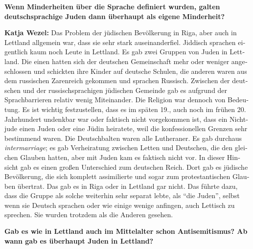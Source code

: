 \begin{otherlanguage}{ngerman}
\textbf{Wenn Minderheiten über die Sprache definiert wurden, galten deutschsprachige Juden dann überhaupt als eigene Minderheit?} 

\textbf{Katja Wezel:} Das Problem der jüdischen Bevölkerung in Riga, aber auch in Lettland allgemein war, dass sie sehr stark auseinanderfiel. Jiddisch sprachen eigentlich kaum noch Leute in Lettland. Es gab zwei Gruppen von Juden in Lettland. Die einen hatten sich der deutschen Gemeinschaft mehr oder weniger angeschlossen und schickten ihre Kinder auf deutsche Schulen, die anderen waren aus dem russischen Zarenreich gekommen und sprachen Russisch. Zwischen der deutschen und der russischsprachigen jüdischen Gemeinde gab es aufgrund der Sprachbarrieren relativ wenig Miteinander. 
Die Religion war dennoch von Bedeutung. Es ist wichtig festzustellen, dass es im späten 19., auch noch im frühen 20. Jahrhundert undenkbar war oder faktisch nicht vorgekommen ist, dass ein Nichtjude einen Juden oder eine Jüdin heiratete, weil die konfessionellen Grenzen sehr bestimmend waren. Die Deutschbalten waren alle Lutheraner. Es gab durchaus \textit{intermarriage}; es gab Verheiratung zwischen Letten und Deutschen, die den gleichen Glauben hatten, aber mit Juden kam es faktisch nicht vor. In dieser Hinsicht gab es einen großen Unterschied zum deutschen Reich. Dort gab es jüdische Bevölkerung, die sich komplett assimilierte und sogar zum protestantischen Glauben übertrat. Das gab es in Riga oder in Lettland gar nicht. Das führte dazu, dass die Gruppe als solche weiterhin sehr separat lebte, als "`die Juden"', selbst wenn sie Deutsch sprachen oder wie einige wenige anfingen, auch Lettisch zu sprechen. Sie wurden trotzdem als die Anderen gesehen. 

\textbf{Gab es wie in Lettland auch im Mittelalter schon Antisemitismus? Ab wann gab es überhaupt Juden in Lettland?}


\end{otherlanguage}
